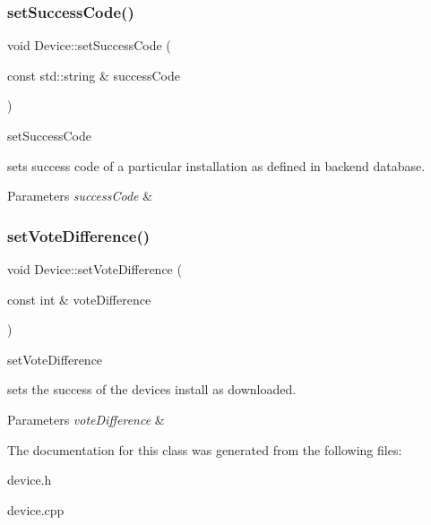 \subsubsection{\texorpdfstring{set\+Success\+Code()}{setSuccessCode()}}
{\footnotesize\ttfamily void Device\+::set\+Success\+Code (\begin{DoxyParamCaption}\item[{const std\+::string \&}]{success\+Code }\end{DoxyParamCaption})}



set\+Success\+Code 

sets success code of a particular installation as defined in backend database. 
\begin{DoxyParams}{Parameters}
{\em success\+Code} & \\
\hline
\end{DoxyParams}
\mbox{\label{classDevice_acf378aa086771dd7c64626abb8a74821}} 
\subsubsection{\texorpdfstring{set\+Vote\+Difference()}{setVoteDifference()}}
{\footnotesize\ttfamily void Device\+::set\+Vote\+Difference (\begin{DoxyParamCaption}\item[{const int \&}]{vote\+Difference }\end{DoxyParamCaption})}



set\+Vote\+Difference 

sets the success of the device\textquotesingle{}s install as downloaded. 
\begin{DoxyParams}{Parameters}
{\em vote\+Difference} & \\
\hline
\end{DoxyParams}


The documentation for this class was generated from the following files\+:\begin{DoxyCompactItemize}
\item 
device.\+h\item 
device.\+cpp\end{DoxyCompactItemize}
